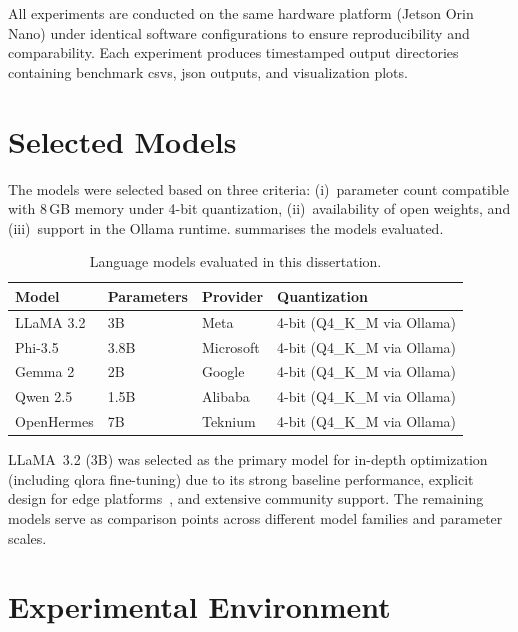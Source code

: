 \documentclass[12pt,a4paper,oneside]{report}
\begin{document}
All experiments are conducted on the same hardware platform (Jetson Orin Nano) under identical software configurations to ensure reproducibility and comparability. Each experiment produces timestamped output directories containing benchmark \glspl{csv}, \gls{json} outputs, and visualization plots.


\section{Selected Models}
\label{sec:meth-models}

The models were selected based on three criteria: (i)~parameter count compatible with 8\,GB memory under 4-bit quantization, (ii)~availability of open weights, and (iii)~support in the Ollama runtime.  summarises the models evaluated.

\begin{table}[htbp]
\caption{Language models evaluated in this dissertation.}
\label{tab:selected-models}
\centering
\begin{tabular}{llll}
\toprule
\textbf{Model} & \textbf{Parameters} & \textbf{Provider} & \textbf{Quantization} \\
\midrule
LLaMA 3.2       & 3B   & Meta        & 4-bit (Q4\_K\_M via Ollama) \\
Phi-3.5          & 3.8B & Microsoft   & 4-bit (Q4\_K\_M via Ollama) \\
Gemma 2          & 2B   & Google      & 4-bit (Q4\_K\_M via Ollama) \\
Qwen 2.5         & 1.5B & Alibaba     & 4-bit (Q4\_K\_M via Ollama) \\
OpenHermes       & 7B   & Teknium     & 4-bit (Q4\_K\_M via Ollama) \\
\bottomrule
\end{tabular}
\end{table}

LLaMA~3.2 (3B) was selected as the primary model for in-depth optimization (including \gls{qlora} fine-tuning) due to its strong baseline performance, explicit design for edge platforms~\cite{meta2024llama3}, and extensive community support. The remaining models serve as comparison points across different model families and parameter scales.


\section{Experimental Environment}
\label{sec:meth-environment}
\end{document}
